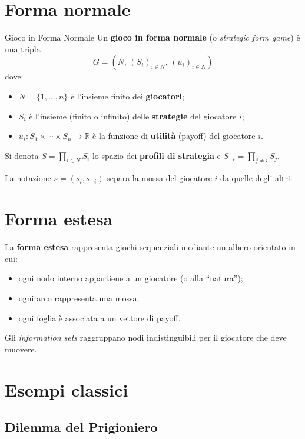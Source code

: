 \documentclass[12pt,a4paper,twoside]{book}
\theoremstyle{plain}
\theoremstyle{definition}
\begin{document}
\section{Forma normale}

\begin{defbox}{Gioco in Forma Normale}
Un \textbf{gioco in forma normale} (o \emph{strategic form game}) è una tripla
\[
  G = (N,\, (S_i)_{i\in N},\, (u_i)_{i\in N})
\]
dove:
\begin{itemize}
  \item $N = \{1,\dots,n\}$ è l'insieme finito dei \textbf{giocatori};
  \item $S_i$ è l'insieme (finito o infinito) delle \textbf{strategie} del giocatore $i$;
  \item $u_i : S_1\times\cdots\times S_n \to \mathbb{R}$ è la funzione di \textbf{utilità} (payoff) del giocatore $i$.
\end{itemize}
Si denota $S = \prod_{i\in N} S_i$ lo spazio dei \textbf{profili di strategia} e $S_{-i} = \prod_{j\ne i} S_j$.
\end{defbox}

La notazione $s = (s_i, s_{-i})$ separa la mossa del giocatore $i$ da quelle degli altri.

\section{Forma estesa}

La \textbf{forma estesa} rappresenta giochi sequenziali mediante un albero orientato in cui:
\begin{itemize}
  \item ogni nodo interno appartiene a un giocatore (o alla ``natura'');
  \item ogni arco rappresenta una mossa;
  \item ogni foglia è associata a un vettore di payoff.
\end{itemize}
Gli \emph{information sets} raggruppano nodi indistinguibili per il giocatore che deve muovere.

\section{Esempi classici}

\subsection{Dilemma del Prigioniero}
\end{document}
